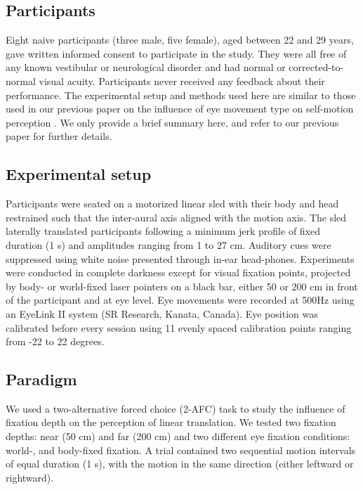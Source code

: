 \subsection{Participants}

Eight naive participants (three male, five female), aged between 22 and 29 years, gave written informed consent to participate in the study. They were all free of any known vestibular or neurological disorder and had normal or corrected-to-normal visual acuity. Participants never received any feedback about their performance.  The experimental setup and methods used here are similar to those used in our previous paper on the influence of eye movement type on self-motion perception \cite{clemens2015a}. We only provide a brief summary here, and refer to our previous paper for further details.

\subsection{Experimental setup}

Participants were seated on a motorized linear sled with their body and head restrained such that the inter-aural axis aligned with the motion axis. The sled laterally translated participants following a minimum jerk profile of fixed duration (1 \si{\second}) and amplitudes ranging from 1 to 27 \si{\centi\metre}. Auditory cues were suppressed using white noise presented through in-ear head-phones. Experiments were conducted in complete darkness except for visual fixation points, projected by body- or world-fixed laser pointers on a black bar, either 50 or 200 \si{\centi\metre} in front of the participant and at eye level. Eye movements were recorded at 500Hz using an EyeLink II system (SR Research, Kanata, Canada). Eye position was calibrated before every session using 11 evenly spaced calibration points ranging from -22 to 22 degrees.


\subsection{Paradigm}

We used a two-alternative forced choice (2-AFC) task to study the influence of fixation depth on the perception of linear translation. We tested two fixation depths: near (50 \si{\centi\metre}) and far (200 \si{\centi\metre}) and two different eye fixation conditions: world-, and body-fixed fixation. A trial contained two sequential motion intervals of equal duration (1 \si{\second}), with the motion in the same direction (either leftward or rightward).

